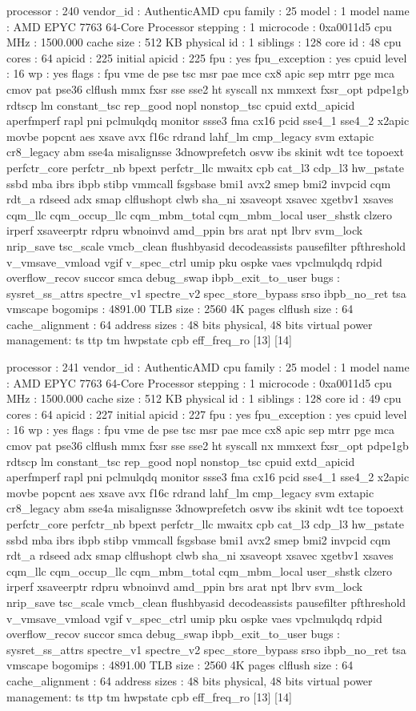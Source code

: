 processor	: 240
vendor_id	: AuthenticAMD
cpu family	: 25
model		: 1
model name	: AMD EPYC 7763 64-Core Processor
stepping	: 1
microcode	: 0xa0011d5
cpu MHz		: 1500.000
cache size	: 512 KB
physical id	: 1
siblings	: 128
core id		: 48
cpu cores	: 64
apicid		: 225
initial apicid	: 225
fpu		: yes
fpu_exception	: yes
cpuid level	: 16
wp		: yes
flags		: fpu vme de pse tsc msr pae mce cx8 apic sep mtrr pge mca cmov pat pse36 clflush mmx fxsr sse sse2 ht syscall nx mmxext fxsr_opt pdpe1gb rdtscp lm constant_tsc rep_good nopl nonstop_tsc cpuid extd_apicid aperfmperf rapl pni pclmulqdq monitor ssse3 fma cx16 pcid sse4_1 sse4_2 x2apic movbe popcnt aes xsave avx f16c rdrand lahf_lm cmp_legacy svm extapic cr8_legacy abm sse4a misalignsse 3dnowprefetch osvw ibs skinit wdt tce topoext perfctr_core perfctr_nb bpext perfctr_llc mwaitx cpb cat_l3 cdp_l3 hw_pstate ssbd mba ibrs ibpb stibp vmmcall fsgsbase bmi1 avx2 smep bmi2 invpcid cqm rdt_a rdseed adx smap clflushopt clwb sha_ni xsaveopt xsavec xgetbv1 xsaves cqm_llc cqm_occup_llc cqm_mbm_total cqm_mbm_local user_shstk clzero irperf xsaveerptr rdpru wbnoinvd amd_ppin brs arat npt lbrv svm_lock nrip_save tsc_scale vmcb_clean flushbyasid decodeassists pausefilter pfthreshold v_vmsave_vmload vgif v_spec_ctrl umip pku ospke vaes vpclmulqdq rdpid overflow_recov succor smca debug_swap ibpb_exit_to_user
bugs		: sysret_ss_attrs spectre_v1 spectre_v2 spec_store_bypass srso ibpb_no_ret tsa vmscape
bogomips	: 4891.00
TLB size	: 2560 4K pages
clflush size	: 64
cache_alignment	: 64
address sizes	: 48 bits physical, 48 bits virtual
power management: ts ttp tm hwpstate cpb eff_freq_ro [13] [14]

processor	: 241
vendor_id	: AuthenticAMD
cpu family	: 25
model		: 1
model name	: AMD EPYC 7763 64-Core Processor
stepping	: 1
microcode	: 0xa0011d5
cpu MHz		: 1500.000
cache size	: 512 KB
physical id	: 1
siblings	: 128
core id		: 49
cpu cores	: 64
apicid		: 227
initial apicid	: 227
fpu		: yes
fpu_exception	: yes
cpuid level	: 16
wp		: yes
flags		: fpu vme de pse tsc msr pae mce cx8 apic sep mtrr pge mca cmov pat pse36 clflush mmx fxsr sse sse2 ht syscall nx mmxext fxsr_opt pdpe1gb rdtscp lm constant_tsc rep_good nopl nonstop_tsc cpuid extd_apicid aperfmperf rapl pni pclmulqdq monitor ssse3 fma cx16 pcid sse4_1 sse4_2 x2apic movbe popcnt aes xsave avx f16c rdrand lahf_lm cmp_legacy svm extapic cr8_legacy abm sse4a misalignsse 3dnowprefetch osvw ibs skinit wdt tce topoext perfctr_core perfctr_nb bpext perfctr_llc mwaitx cpb cat_l3 cdp_l3 hw_pstate ssbd mba ibrs ibpb stibp vmmcall fsgsbase bmi1 avx2 smep bmi2 invpcid cqm rdt_a rdseed adx smap clflushopt clwb sha_ni xsaveopt xsavec xgetbv1 xsaves cqm_llc cqm_occup_llc cqm_mbm_total cqm_mbm_local user_shstk clzero irperf xsaveerptr rdpru wbnoinvd amd_ppin brs arat npt lbrv svm_lock nrip_save tsc_scale vmcb_clean flushbyasid decodeassists pausefilter pfthreshold v_vmsave_vmload vgif v_spec_ctrl umip pku ospke vaes vpclmulqdq rdpid overflow_recov succor smca debug_swap ibpb_exit_to_user
bugs		: sysret_ss_attrs spectre_v1 spectre_v2 spec_store_bypass srso ibpb_no_ret tsa vmscape
bogomips	: 4891.00
TLB size	: 2560 4K pages
clflush size	: 64
cache_alignment	: 64
address sizes	: 48 bits physical, 48 bits virtual
power management: ts ttp tm hwpstate cpb eff_freq_ro [13] [14]

